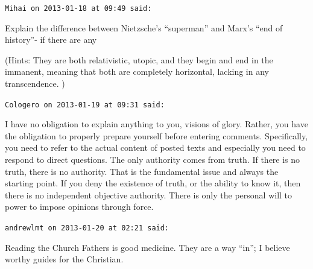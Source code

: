 \begin{footnotesize}
\begin{sffamily}
\hfill

\texttt{Mihai on 2013-01-18 at 09:49 said:}

Explain the difference between Nietzsche's ``superman'' and Marx's ``end of history''- if there are any

(Hints: They are both relativistic, utopic, and they begin and end in the immanent, meaning that both are completely horizontal, lacking in any transcendence. )

\hfill

\texttt{Cologero on 2013-01-19 at 09:31 said:}

I have no obligation to explain anything to you, visions of glory. Rather, you have the obligation to properly prepare yourself before entering comments. Specifically, you need to refer to the actual content of posted texts and especially you need to respond to direct questions. The only authority comes from truth. If there is no truth, there is no authority. That is the fundamental issue and always the starting point. If you deny the existence of truth, or the ability to know it, then there is no independent objective authority. There is only the personal will to power to impose opinions through force.

\hfill

\texttt{andrewlmt on 2013-01-20 at 02:21 said:}

Reading the Church Fathers is good medicine. They are a way ``in''; I believe worthy guides for the Christian.

\hfill

\end{sffamily}
\end{footnotesize}



